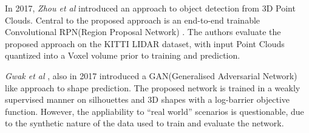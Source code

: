 In 2017, \textit{Zhou et al} \cite{Zhou2017_2} introduced an approach to object detection from 3D Point 
Clouds. Central to the proposed approach is an end-to-end trainable Convolutional RPN(Region Proposal 
Network) \cite{RPN}. The authors evaluate the proposed approach on the KITTI LIDAR \cite{Geiger2013} 
dataset, with input Point Clouds quantized into a Voxel volume prior to training and prediction.

\textit{Gwak et al} \cite{Gwak2017}, also in 2017 introduced a GAN(Generalised Adversarial Network) like 
approach to shape prediction. The proposed network is trained in a weakly supervised manner on 
silhouettes and 3D shapes with a log-barrier \cite{LB} objective function. However, the appliability 
to ``real world'' scenarios is questionable, due to the synthetic nature of the data used to train and 
evaluate the network.

